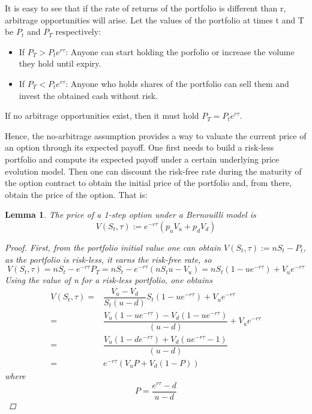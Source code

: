 \documentclass[12,twoside]{mammeTFM}
\newtheorem{lem}[thm]{Lemma}
\theoremstyle{definition}
\theoremstyle{remark}
\begin{document}
It is easy to see that if the rate of returns of the portfolio is different than r, arbitrage opportunities will arise. Let the values of the portfolio at times t and T be $P_t$ and $P_T$ respectively:
\begin{itemize}
\item If $P_T > P_t e^{r\tau}$: Anyone can start holding the porfolio or increase the volume they hold until expiry.
\item If $P_T < P_t e^{r\tau}$: Anyone who holds shares of the portfolio can sell them and invest the obtained cash without risk.
\end{itemize}
If no arbitrage opportunities exist, then it must hold $P_T = P_t e^{r\tau}$.

Hence, the no-arbitrage assumption provides a way to valuate the current price of an option through its expected payoff. One first needs to build a risk-less portfolio and compute its expected payoff under a certain underlying price evolution model. Then one can discount the risk-free rate during the maturity of the option contract to obtain the initial price of the portfolio and, from there, obtain the price of the option. That is:
\begin{lem} The price of a 1-step option under a Bernouilli model is
\begin{equation}
V(S_t, \tau) := e^{-r\tau} \left( p_u V_u + p_d V_d \right)
\end{equation}
\begin{proof}
First, from the portfolio initial value one can obtain $V(S_t, \tau) := n S_t - P_t$, as the portfolio is risk-less,  it earns the risk-free rate, so 
\begin{equation}
V(S_t, \tau) = n S_t - e^{-r\tau} P_T = n S_t - e^{-r\tau}\left(n S_t u - V_u \right) = nS_t(1 - u e^{-r\tau}) + V_u e^{-r\tau}
\end{equation}
Using the value of n for a risk-less portfolio, one obtains
\begin{align}
V(S_t, \tau) =& \dfrac{V_u - V_d}{S_t(u - d)} S_t(1 - u e^{-r\tau}) + V_u e^{-r\tau} \\
 =& \dfrac{V_u (1 - u e^{-r\tau}) - V_d (1 - u e^{-r\tau})}{(u - d)} + V_u e^{-r\tau} \\
 =& \dfrac{V_u (1 - d e^{-r\tau}) + V_d (u e^{-r\tau} - 1)}{(u - d)} \\
 \label{eq:discounted_expected_payoff}
 =& e^{-r\tau} \left( V_u P + V_d (1 - P) \right)
\end{align}
where
\begin{equation}
P = \dfrac{e^{r\tau} - d}{u - d}
\end{equation}
\end{proof}
\end{lem}
\end{document}
